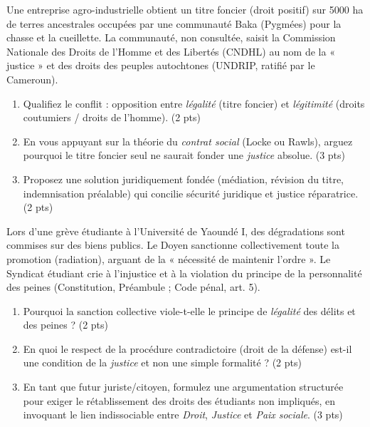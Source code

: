 \documentclass[11pt]{article}
\begin{document}
\begin{exercice}
Une entreprise agro-industrielle obtient un titre foncier (droit positif) sur 5000 ha de terres ancestrales occupées par une communauté Baka (Pygmées) pour la chasse et la cueillette. La communauté, non consultée, saisit la Commission Nationale des Droits de l'Homme et des Libertés (CNDHL) au nom de la « justice » et des droits des peuples autochtones (UNDRIP, ratifié par le Cameroun).
\begin{enumerate}
    \item Qualifiez le conflit : opposition entre \textit{légalité} (titre foncier) et \textit{légitimité} (droits coutumiers / droits de l'homme). (2 pts)
    \item En vous appuyant sur la théorie du \textit{contrat social} (Locke ou Rawls), arguez pourquoi le titre foncier seul ne saurait fonder une \textit{justice} absolue. (3 pts)
    \item Proposez une solution juridiquement fondée (médiation, révision du titre, indemnisation préalable) qui concilie sécurité juridique et justice réparatrice. (2 pts)
\end{enumerate}
\end{exercice}

\begin{exercice}
Lors d'une grève étudiante à l'Université de Yaoundé I, des dégradations sont commises sur des biens publics. Le Doyen sanctionne collectivement toute la promotion (radiation), arguant de la « nécessité de maintenir l'ordre ». Le Syndicat étudiant crie à l'injustice et à la violation du principe de la personnalité des peines (Constitution, Préambule ; Code pénal, art. 5).
\begin{enumerate}
    \item Pourquoi la sanction collective viole-t-elle le principe de \textit{légalité} des délits et des peines ? (2 pts)
    \item En quoi le respect de la procédure contradictoire (droit de la défense) est-il une condition de la \textit{justice} et non une simple formalité ? (2 pts)
    \item En tant que futur juriste/citoyen, formulez une argumentation structurée pour exiger le rétablissement des droits des étudiants non impliqués, en invoquant le lien indissociable entre \textit{Droit}, \textit{Justice} et \textit{Paix sociale}. (3 pts)
\end{enumerate}
\end{exercice}
\end{document}
